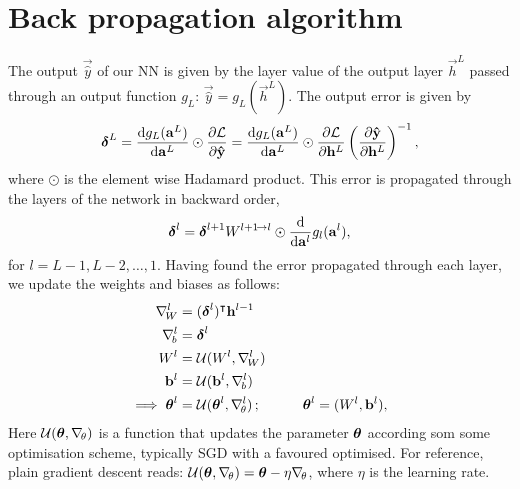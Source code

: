 \section{Back propagation algorithm}\label{app:backprop}
    The output $\vec{\hat{y}}$ of our NN is given by the layer value of the output layer $\vec{h}^L$ passed through an output function $g_L$: $\vec{\hat{y}} = g_L(\vec{h}^L)$. The output error is given by
    \begin{equation}\label{eq:app_backprop_output_error}
        \boldsymbol{\delta}^L = \dv{g_L(\mathbf{a}^L)}{\mathbf{a}^L} \odot \pdv{\mathcal{L}}{\mathbf{\hat{y}}} =\dv{g_L(\mathbf{a}^L)}{\mathbf{a}^L} \odot \pdv{\mathcal{L}}{\mathbf{h}^L}\left( \pdv{\mathbf{\hat{y}}}{\mathbf{h}^L} \right)^{-1},
    \end{equation}
    where $\odot$ is the element wise Hadamard product. This error is propagated through the layers of the network in backward order,
    \begin{equation}\label{eq:app_backprop_prop_error}
        \boldsymbol{\delta}^l = \boldsymbol{\delta}^{l+1}W^{l+1\!\to l} \odot \dv{}{\mathbf{a}^l}g_l(\mathbf{a}^l),
    \end{equation}
    for $l=L-1, L-2,\dots, 1$. Having found the error propagated through each layer, we update the weights and biases as follows:
    \begin{equation}\label{eq:app_backprop_update}
        \begin{split}
            \nabla_{\!W}^l &= (\boldsymbol{\delta}^l)^\intercal\mathbf{h}^{l-1} \\
            \nabla_{\!b}^l &= \boldsymbol{\delta}^l \\
            W^l &= \mathcal{U}(W^l, \nabla_{\!W}^l)\\
            \mathbf{b}^l &= \mathcal{U}(\mathbf{b}^l, \nabla_{\!b}^l) \\
            \implies \boldsymbol{\theta}^l &= \mathcal{U}(\boldsymbol{\theta}^l, \nabla_{\!\theta}^l) \,;\quad\quad\quad \boldsymbol{\theta}^l = (W^l, \mathbf{b}^l)
,        \end{split}
    \end{equation}
    Here $\mathcal{U}(\boldsymbol{\theta}, \nabla_{\!\theta})$ is a function that updates the parameter $\boldsymbol{\theta}$ according som some optimisation scheme, typically SGD with a favoured optimised. For reference, plain gradient descent reads: $\mathcal{U}(\boldsymbol{\theta}, \nabla_{\!\theta}) = \boldsymbol{\theta} - \eta\nabla_{\!\theta}$, where $\eta$ is the learning rate. 


